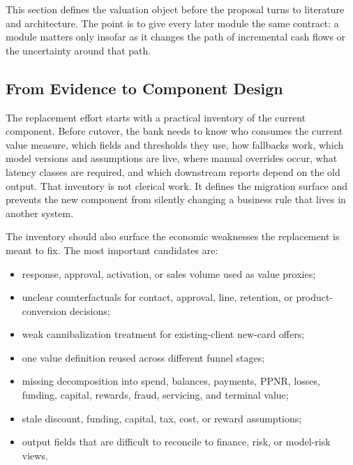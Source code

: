 \documentclass[11pt]{article}
\newcommand{\1}{\mathbf{1}}
\begin{document}
This section defines the valuation object before the proposal turns to
literature and architecture.  The point is to give every later module the same
contract: a module matters only insofar as it changes the path of incremental
cash flows or the uncertainty around that path.

\subsection{From Evidence to Component Design}
\label{sec:replacement-boundary}

The replacement effort starts with a practical inventory of the current
component. Before cutover, the bank needs to know who consumes the current value
measure, which fields and thresholds they use, how fallbacks work, which model
versions and assumptions are live, where manual overrides occur, what latency
classes are required, and which downstream reports depend on the old output.
That inventory is not clerical work. It defines the migration surface and
prevents the new component from silently changing a business rule that lives in
another system.

The inventory should also surface the economic weaknesses the replacement is
meant to fix. The most important candidates are:
\begin{itemize}[leftmargin=*]
  \item response, approval, activation, or sales volume used as value proxies;
  \item unclear counterfactuals for contact, approval, line, retention, or
        product-conversion decisions;
  \item weak cannibalization treatment for existing-client new-card offers;
  \item one value definition reused across different funnel stages;
  \item missing decomposition into spend, balances, payments, PPNR, losses,
        funding, capital, rewards, fraud, servicing, and terminal value;
  \item stale discount, funding, capital, tax, cost, or reward assumptions;
  \item output fields that are difficult to reconcile to finance, risk, or
        model-risk views.
\end{itemize}
\end{document}
